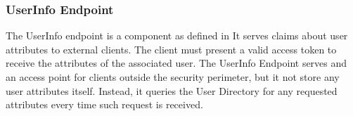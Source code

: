 \subsubsection{UserInfo Endpoint}
The UserInfo endpoint is a component as defined in
It serves claims about user attributes to external clients. The client must present a valid access token to receive the attributes of the associated user. The UserInfo Endpoint serves and an access point for clients outside the security perimeter, but it not store any user attributes itself. Instead, it queries the User Directory for any requested attributes every time such request is received.
% 